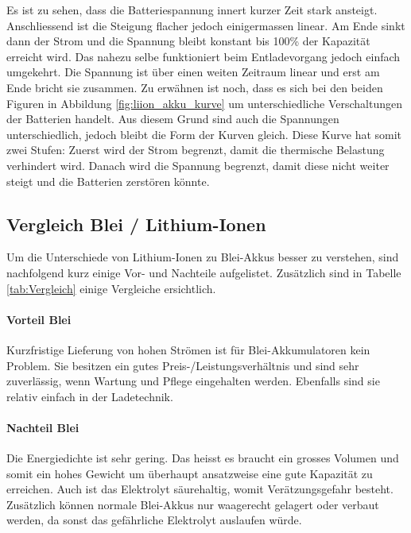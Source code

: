 Es ist zu sehen, dass die Batteriespannung innert kurzer Zeit stark ansteigt. Anschliessend ist die Steigung flacher jedoch einigermassen linear. Am Ende sinkt dann der Strom und die Spannung bleibt konstant bis 100\% der Kapazität erreicht wird.
Das nahezu selbe funktioniert beim Entladevorgang jedoch einfach umgekehrt. Die Spannung ist über einen weiten Zeitraum linear und erst am Ende bricht sie zusammen.
Zu erwähnen ist noch, dass es sich bei den beiden Figuren in Abbildung \ref{fig:liion_akku_kurve} um unterschiedliche Verschaltungen der Batterien handelt. Aus diesem Grund sind auch die Spannungen unterschiedlich, jedoch bleibt die Form der Kurven gleich. Diese Kurve hat somit zwei Stufen: Zuerst wird der Strom begrenzt, damit die thermische Belastung verhindert wird. Danach wird die Spannung begrenzt, damit diese nicht weiter steigt und die Batterien zerstören könnte.

\newpage

\subsection{Vergleich Blei / Lithium-Ionen} \label{kap:Vergleich_liion_pb}

Um die Unterschiede von Lithium-Ionen zu Blei-Akkus besser zu verstehen, sind nachfolgend kurz einige Vor- und Nachteile aufgelistet. Zusätzlich sind in Tabelle \ref{tab:Vergleich} einige Vergleiche ersichtlich.

\paragraph{Vorteil Blei}

Kurzfristige Lieferung von hohen Strömen ist für Blei-Akkumulatoren kein Problem. Sie besitzen ein gutes Preis-/Leistungsverhältnis und sind sehr zuverlässig, wenn Wartung und Pflege eingehalten werden. Ebenfalls sind sie relativ einfach in der Ladetechnik.

\paragraph{Nachteil Blei}

Die Energiedichte ist sehr gering. Das heisst es braucht ein grosses Volumen und somit ein hohes Gewicht um überhaupt ansatzweise eine gute Kapazität zu erreichen. Auch ist das Elektrolyt säurehaltig, womit Verätzungsgefahr besteht. Zusätzlich können normale Blei-Akkus nur waagerecht gelagert oder verbaut werden, da sonst das gefährliche Elektrolyt auslaufen würde.

